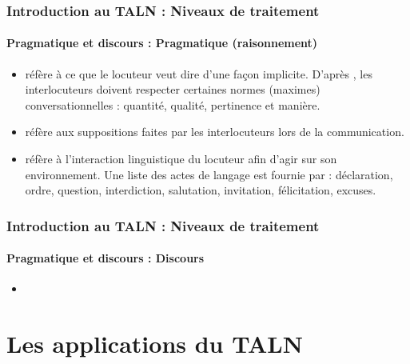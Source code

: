 \documentclass[xcolor=table]{beamer}
\begin{document}
\begin{frame}
\frametitle{Introduction au TALN : Niveaux de traitement}
\framesubtitle{Pragmatique et discours : Pragmatique (raisonnement)}


\begin{itemize}
	\item {} réfère à ce que le locuteur veut dire d'une façon implicite.
	D'après \cite{1979-Grice}, les interlocuteurs doivent respecter certaines normes (maximes) conversationnelles  : quantité, qualité, pertinence et manière. 
	
	\item {} réfère aux suppositions faites par les interlocuteurs lors de la communication.
	
	\item {} réfère à l'interaction linguistique du locuteur afin d'agir sur son environnement. Une liste des actes de langage est fournie par \cite{1962-austin} : déclaration, ordre, question, interdiction, salutation, invitation, félicitation, excuses.
\end{itemize}

\end{frame}

\begin{frame}
\frametitle{Introduction au TALN : Niveaux de traitement}
\framesubtitle{Pragmatique et discours : Discours}

\begin{itemize}
	\item 
\end{itemize}

\end{frame}

\section{Les applications du TALN}
\end{document}

